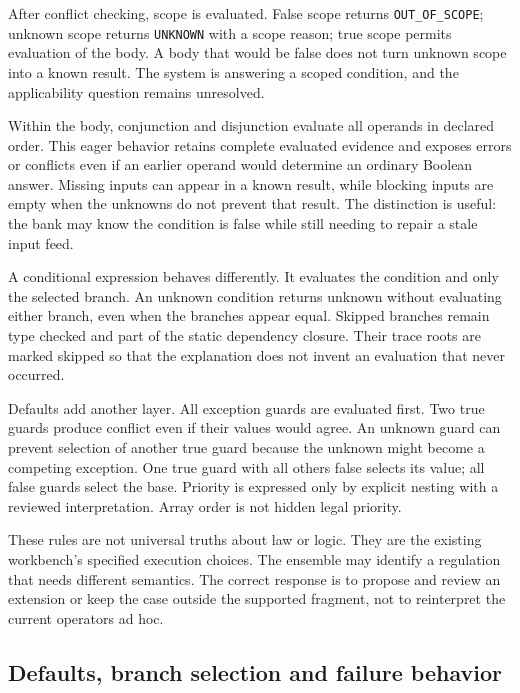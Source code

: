 After conflict checking, scope is evaluated. False scope returns
\texttt{OUT\_OF\_SCOPE}; unknown scope returns \texttt{UNKNOWN} with a scope reason;
true scope permits evaluation of the body. A body that would be false does not
turn unknown scope into a known result. The system is answering a scoped
condition, and the applicability question remains unresolved.


Within the body, conjunction and disjunction evaluate all operands in declared
order. This eager behavior retains complete evaluated evidence and exposes errors
or conflicts even if an earlier operand would determine an ordinary Boolean
answer. Missing inputs can appear in a known result, while blocking inputs are
empty when the unknowns do not prevent that result. The distinction is useful:
the bank may know the condition is false while still needing to repair a stale
input feed.

A conditional expression behaves differently. It evaluates the condition and
only the selected branch. An unknown condition returns unknown without evaluating
either branch, even when the branches appear equal. Skipped branches remain type
checked and part of the static dependency closure. Their trace roots are marked
skipped so that the explanation does not invent an evaluation that never occurred.

Defaults add another layer. All exception guards are evaluated first. Two true
guards produce conflict even if their values would agree. An unknown guard can
prevent selection of another true guard because the unknown might become a
competing exception. One true guard with all others false selects its value; all
false guards select the base. Priority is expressed only by explicit nesting with
a reviewed interpretation. Array order is not hidden legal priority.

These rules are not universal truths about law or logic. They are the existing
workbench's specified execution choices. The ensemble may identify a regulation
that needs different semantics. The correct response is to propose and review an
extension or keep the case outside the supported fragment, not to reinterpret
the current operators ad hoc.

\subsection{Defaults, branch selection and failure behavior}
\label{merge:P-03a-rule-contract:02}


